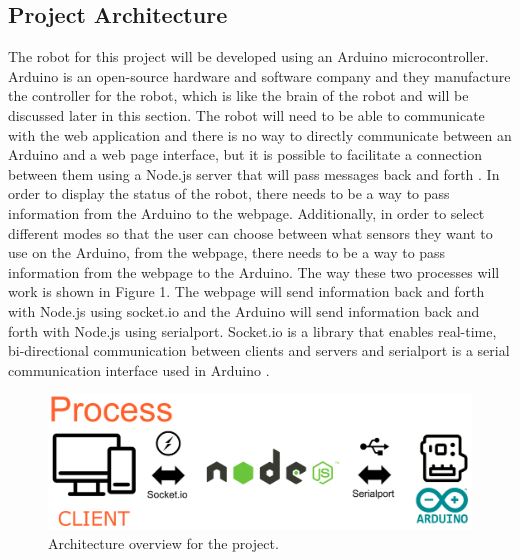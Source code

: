 \documentclass[10pt,twocolumn]{article}
\begin{document}
\subsection{Project Architecture}
The robot for this project will be developed using an Arduino microcontroller. Arduino is an open-source hardware and software company and they manufacture the controller for the robot, which is like the brain of the robot and will be discussed later in this section. The robot will need to be able to communicate with the web application and there is no way to directly communicate between an Arduino and a web page interface, but it is possible to facilitate a connection between them using a Node.js server that will pass messages back and forth \cite{Thomas2020Communicating}. In order to display the status of the robot, there needs to be a way to pass information from the Arduino to the webpage. Additionally, in order to select different modes so that the user can choose between what sensors they want to use on the Arduino, from the webpage, there needs to be a way to pass information from the webpage to the Arduino. The way these two processes will work is shown in Figure 1. The webpage will send information  back and forth with Node.js using socket.io and the Arduino will send information back and forth with Node.js using serialport. Socket.io is a library that enables real-time, bi-directional communication between clients and servers and serialport is a serial communication interface used in Arduino \cite{Fitzgerald2015Arduino}.

\begin{figure}
    \centering
    \includegraphics[width=.95\linewidth]{Figure 1.png}
    \caption{
        Architecture overview for the project.
    }
    \label{fig:fig1}
\end{figure}
\end{document}

